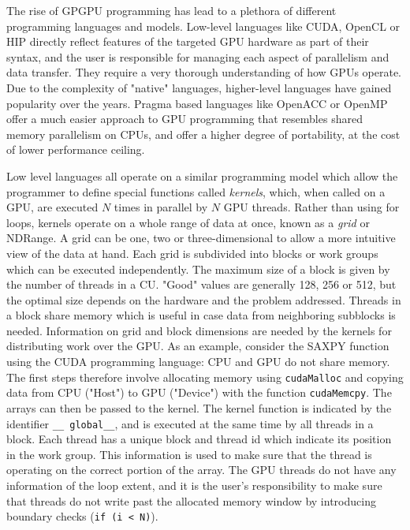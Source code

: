 The rise of GPGPU programming has lead to a plethora of different programming languages and models. Low-level languages like CUDA, OpenCL or HIP directly reflect features of the targeted GPU hardware as part of their syntax, and the user is responsible for managing each aspect of parallelism and data transfer. They require a very thorough understanding of how GPUs operate. Due to the complexity of "native" languages, higher-level languages have gained popularity over the years. Pragma based languages like OpenACC or OpenMP offer a much easier approach to GPU programming that resembles shared memory parallelism on CPUs, and offer a higher degree of portability, at the cost of lower performance ceiling.

Low level languages all operate on a similar programming model which allow the programmer to define special functions called \emph{kernels}, which, when called on a GPU, are executed $N$ times in parallel by $N$ GPU threads. Rather than using for loops, kernels operate on a whole range of data at once, known as a \emph{grid} or NDRange. A grid can be one, two or three-dimensional to allow a more intuitive view of the data at hand. Each grid is subdivided into blocks or work groups which can be executed independently. The maximum size of a block is given by the number of threads in a CU. "Good" values are generally 128, 256 or 512, but the optimal size depends on the hardware and the problem addressed. Threads in a block share memory which is useful in case data from neighboring subblocks is needed. Information on grid and block dimensions are needed by the kernels for distributing work over the GPU. As an example, consider the SAXPY function using the CUDA programming language:
\noindent CPU and GPU do not share memory. The first steps therefore involve allocating memory using \texttt{cudaMalloc} and copying data from CPU ("Host") to GPU ("Device") with the function \texttt{cudaMemcpy}. The arrays can then be passed to the kernel. The kernel function is indicated by the identifier \texttt{\_\_ global\_\_}, and is executed at the same time by all threads in a block. Each thread has a unique block and thread id which indicate its position in the work group. This information is used to make sure that the thread is operating on the correct portion of the array. The GPU threads do not have any information of the loop extent, and it is the user's responsibility to make sure that threads do not write past the allocated memory window by introducing boundary checks (\texttt{if (i < N)}).


